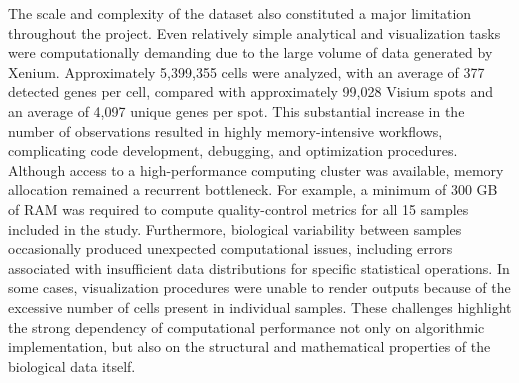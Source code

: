 The scale and complexity of the dataset also constituted a major limitation throughout the project. Even relatively simple analytical and visualization tasks were computationally demanding due to the large volume of data generated by Xenium. Approximately 5,399,355 cells were analyzed, with an average of 377 detected genes per cell, compared with approximately 99,028 Visium spots and an average of 4,097 unique genes per spot. This substantial increase in the number of observations resulted in highly memory-intensive workflows, complicating code development, debugging, and optimization procedures. Although access to a high-performance computing cluster was available, memory allocation remained a recurrent bottleneck. For example, a minimum of 300 GB of RAM was required to compute quality-control metrics for all 15 samples included in the study. Furthermore, biological variability between samples occasionally produced unexpected computational issues, including errors associated with insufficient data distributions for specific statistical operations. In some cases, visualization procedures were unable to render outputs because of the excessive number of cells present in individual samples. These challenges highlight the strong dependency of computational performance not only on algorithmic implementation, but also on the structural and mathematical properties of the biological data itself.



